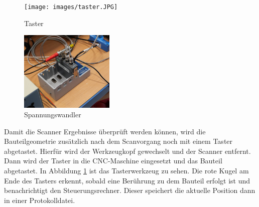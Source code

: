 \documentclass[../main.tex]{subfiles}
\begin{document}
\begin{figure}[h]
    \texttt{[image: images/taster.JPG]}
    \caption{Taster}
    \label{fig:taster}
\end{figure}

\begin{figure}[h]
    \includegraphics[width=0.4\textwidth]{images/piezoelektrische.JPG}
    \caption{Spannungswandler}
    \label{fig:piez}
\end{figure}


Damit die Scanner Ergebnisse überprüft werden können,
wird die Bauteilgeometrie zusätzlich nach dem Scanvorgang noch mit einem Taster
abgetastet. Hierfür wird der Werkzeugkopf gewechselt und der Scanner entfernt.
Dann wird der Taster in die CNC-Maschine eingesetzt und das Bauteil abgetastet.
In Abbildung \ref{fig:taster} ist das Tasterwerkzeug zu sehen. Die rote Kugel 
am Ende des Tasters erkennt, sobald eine Berührung zu dem Bauteil erfolgt ist 
und benachrichtigt den Steuerungsrechner. Dieser speichert die aktuelle Position 
dann in einer Protokolldatei.
\end{document}
